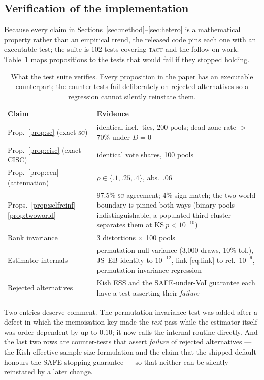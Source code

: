 \documentclass{article}
\newcommand{\SC}{\textsc{sc}}
\newcommand{\TACT}{\textsc{tact}}
\begin{document}
\subsection{Verification of the implementation}\label{sec:tests}
Because every claim in Sections~\ref{sec:method}--\ref{sec:hetero} is a
mathematical property rather than an empirical trend, the released code pins
each one with an executable test; the suite is 102 tests covering \TACT{} and the
follow-on work. Table~\ref{tab:tests}
maps propositions to the tests that would fail if they stopped holding.

\begin{table}[t]
\centering
\caption{What the test suite verifies. Every proposition in the paper has an
executable counterpart; the counter-tests fail deliberately on rejected
alternatives so a regression cannot silently reinstate them.}
\label{tab:tests}
\setlength{\tabcolsep}{3.4pt}
\begin{tabular}{p{3.0cm} p{4.8cm}}
\toprule
Claim & Evidence \\
\midrule
Prop.~\ref{prop:sc} (exact \SC) & identical incl.\ ties, 200 pools; dead-zone rate $>$70\% under $D{=}0$ \\
Prop.~\ref{prop:cisc} (exact CISC) & identical vote shares, 100 pools \\
Prop.~\ref{prop:ccn} (attenuation) & $\rho\in\{.1,.25,.4\}$, abs.\ $.06$ \\
Props.~\ref{prop:selfreinf}--\ref{prop:twoworld} & 97.5\% \SC{} agreement; 4\% sign match; the two-world boundary is pinned both ways (binary pools indistinguishable, a populated third cluster separates them at $\mathrm{KS}\ p<10^{-10}$) \\
Rank invariance & 3 distortions $\times$ 100 pools \\
Estimator internals & permutation null variance (3{,}000 draws, 10\% tol.), JS--EB identity to $10^{-12}$, link \eqref{eq:link} to rel.\ $10^{-9}$, permutation-invariance regression \\
Rejected alternatives & Kish ESS and the SAFE-under-VoI guarantee each have a test asserting their \emph{failure} \\
\bottomrule
\end{tabular}
\end{table}

Two entries deserve comment. The permutation-invariance test was added after a
defect in which the memoisation key made the \emph{test} pass while the
estimator itself was order-dependent by up to $0.10$; it now calls the internal
routine directly. And the last two rows are counter-tests that assert
\emph{failure} of rejected alternatives --- the Kish effective-sample-size
formulation and the claim that the shipped default honours the SAFE stopping
guarantee --- so that neither can be silently reinstated by a later change.
\end{document}
